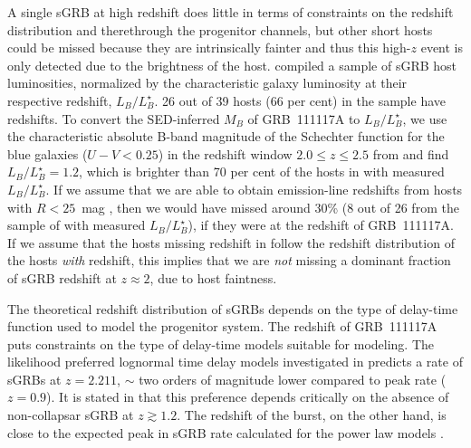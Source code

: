 \documentclass{aa}    %
\newcommand\todo[1]{\textbf{(#1)}}
\begin{document}
A single sGRB at high redshift does little in terms of constraints on the
redshift distribution and therethrough the progenitor channels, but other short
hosts could be missed because they are intrinsically fainter and thus this
high-$z$ event is only detected due to the brightness of the host.
\citet{Berger2014} compiled a sample of sGRB host luminosities, normalized by
the characteristic galaxy luminosity at their respective redshift,
$L_B/L^{\star}_{B}$. 26 out of 39 hosts (66 per cent) in the sample have
redshifts. To convert the SED-inferred $M_B$ of GRB~111117A to
$L_B/L^{\star}_{B}$, we use the characteristic absolute B-band magnitude of the
Schechter function for the blue galaxies ($U - V < 0.25$) in the redshift window
$2.0 \leq z \leq 2.5$ from \citet{Marchesini2007} and find $L_B/L^{\star}_{B} =
1.2$, which is brighter than 70 per cent of the hosts in \citet{Berger2014} with
measured $L_B/L^{\star}_{B}$. If we assume that we are able to obtain emission-line
redshifts from hosts with $R < 25$~mag \citep{Kruhler2012}, then we would have
missed around 30\% (8 out of 26 from the sample of \citealt{Berger2014} with
measured $L_B/L^{\star}_{B}$), if they were at the redshift of GRB~111117A. If
we assume that the hosts missing redshift in \citet{Berger2014} follow the
redshift distribution of the hosts \textit{with} redshift, this implies that we
are \textit{not} missing a dominant fraction of sGRB redshift at $z \approx 2$,
due to host faintness.

The theoretical redshift distribution of sGRBs depends on the type of delay-time
function used to model the progenitor system. The redshift of GRB~111117A puts
constraints on the type of delay-time models suitable for modeling. The
likelihood preferred lognormal time delay models investigated in
\citet{Wanderman2015} predicts a rate of sGRBs at $z = 2.211$, $\sim$ two orders
of magnitude lower compared to peak rate ($z = 0.9$). It is stated in
\citet{Wanderman2015} that this preference depends critically on the absence of
non-collapsar sGRB at $z \gtrsim 1.2$. The redshift of the burst, on the other
hand, is close to the expected peak in sGRB rate calculated for the power law
models \citep{Behroozi2014, Wanderman2015}.



\end{document}
